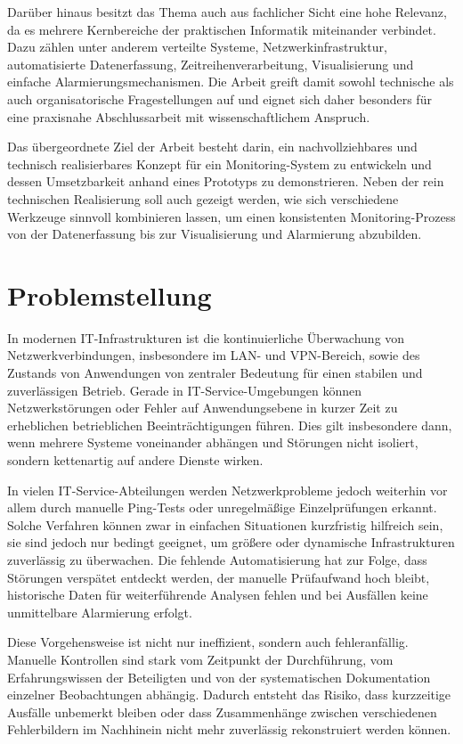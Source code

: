 Darüber hinaus besitzt das Thema auch aus fachlicher Sicht eine hohe Relevanz, da es mehrere Kernbereiche der praktischen Informatik miteinander verbindet. Dazu zählen unter anderem verteilte Systeme, Netzwerkinfrastruktur, automatisierte Datenerfassung, Zeitreihenverarbeitung, Visualisierung und einfache Alarmierungsmechanismen. Die Arbeit greift damit sowohl technische als auch organisatorische Fragestellungen auf und eignet sich daher besonders für eine praxisnahe Abschlussarbeit mit wissenschaftlichem Anspruch.  

Das übergeordnete Ziel der Arbeit besteht darin, ein nachvollziehbares und technisch realisierbares Konzept für ein Monitoring-System zu entwickeln und dessen Umsetzbarkeit anhand eines Prototyps zu demonstrieren. Neben der rein technischen Realisierung soll auch gezeigt werden, wie sich verschiedene Werkzeuge sinnvoll kombinieren lassen, um einen konsistenten Monitoring-Prozess von der Datenerfassung bis zur Visualisierung und Alarmierung abzubilden.  


\section{Problemstellung}

In modernen IT-Infrastrukturen ist die kontinuierliche Überwachung von Netzwerkverbindungen, insbesondere im LAN- und VPN-Bereich, sowie des Zustands von Anwendungen von zentraler Bedeutung für einen stabilen und zuverlässigen Betrieb. Gerade in IT-Service-Umgebungen können Netzwerkstörungen oder Fehler auf Anwendungsebene in kurzer Zeit zu erheblichen betrieblichen Beeinträchtigungen führen. Dies gilt insbesondere dann, wenn mehrere Systeme voneinander abhängen und Störungen nicht isoliert, sondern kettenartig auf andere Dienste wirken.

In vielen IT-Service-Abteilungen werden Netzwerkprobleme jedoch weiterhin vor allem durch manuelle Ping-Tests oder unregelmäßige Einzelprüfungen erkannt. Solche Verfahren können zwar in einfachen Situationen kurzfristig hilfreich sein, sie sind jedoch nur bedingt geeignet, um größere oder dynamische Infrastrukturen zuverlässig zu überwachen. Die fehlende Automatisierung hat zur Folge, dass Störungen verspätet entdeckt werden, der manuelle Prüfaufwand hoch bleibt, historische Daten für weiterführende Analysen fehlen und bei Ausfällen keine unmittelbare Alarmierung erfolgt.

Diese Vorgehensweise ist nicht nur ineffizient, sondern auch fehleranfällig. Manuelle Kontrollen sind stark vom Zeitpunkt der Durchführung, vom Erfahrungswissen der Beteiligten und von der systematischen Dokumentation einzelner Beobachtungen abhängig. Dadurch entsteht das Risiko, dass kurzzeitige Ausfälle unbemerkt bleiben oder dass Zusammenhänge zwischen verschiedenen Fehlerbildern im Nachhinein nicht mehr zuverlässig rekonstruiert werden können.

